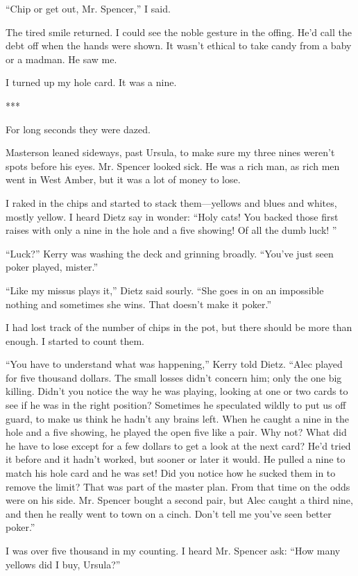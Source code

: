 \documentclass{novel}
\begin{document}
“Chip or get out, Mr. Spencer,” I said.

The tired smile returned. I could see the noble gesture in the offing. He’d call the debt off when the hands were shown. It wasn’t ethical to take candy from a baby or a madman. He saw me.

I turned up my hole card. It was a nine.

***

For long seconds they were dazed.

Masterson leaned sideways, past Ursula, to make sure my three nines weren’t spots before his eyes. Mr. Spencer looked sick. He was a rich man, as rich men went in West Amber, but it was a lot of money to lose.

I raked in the chips and started to stack them—yellows and blues and whites, mostly yellow. I heard Dietz say in wonder: “Holy cats! You backed those first raises with only a nine in the hole and a five showing! Of all the dumb luck! ”

“Luck?” Kerry was washing the deck and grinning broadly. “You’ve just seen poker played, mister.”

“Like my missus plays it,” Dietz said sourly. “She goes in on an impossible nothing and sometimes she wins. That doesn’t make it poker.”

I had lost track of the number of chips in the pot, but there should be more than enough. I started to count them.

“You have to understand what was happening,” Kerry told Dietz. “Alec played for five thousand dollars. The small losses didn’t concern him; only the one big killing. Didn’t you notice the way he was playing, looking at one or two cards to see if he was in the right position? Sometimes he speculated wildly to put us off guard, to make us think he hadn’t any brains left. When he caught a nine in the hole and a five showing, he played the open five like a pair. Why not? What did he have to lose except for a few dollars to get a look at the next card? He’d tried it before and it hadn’t worked, but sooner or later it would. He pulled a nine to match his hole card and he was set! Did you notice how he sucked them in to remove the limit? That was part of the master plan. From that time on the odds were on his side. Mr. Spencer bought a second pair, but Alec caught a third nine, and then he really went to town on a cinch. Don’t tell me you’ve seen better poker.”

I was over five thousand in my counting. I heard Mr. Spencer ask: “How many yellows did I buy, Ursula?”
\end{document}
